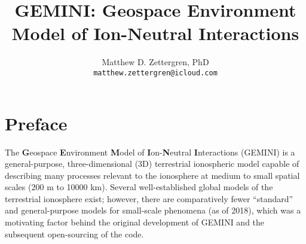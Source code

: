 \documentclass[11pt,letterpaper]{article}
\begin{document}
\setlength{\parindent}{0mm}
\setlength{\parskip}{0.4cm}




\title{\textbf{GEMINI}:  \textbf{G}eospace \textbf{E}nvironment \textbf{M}odel of \textbf{I}on-\textbf{N}eutral \textbf{I}nteractions}
\author{Matthew D. Zettergren, PhD\\ \texttt{matthew.zettergren@icloud.com}}
\maketitle

\tableofcontents

\pagebreak








\section{Preface}

The \textbf{G}eospace \textbf{E}nvironment \textbf{M}odel of \textbf{I}on-\textbf{N}eutral \textbf{I}nteractions (GEMINI) is a general-purpose, three-dimensional (3D) terrestrial ionospheric model capable of describing many processes relevant to the ionosphere at medium to small spatial scales (200 m to 10000 km).  Several well-established global models of the terrestrial ionosphere exist; however, there are comparatively fewer ``standard'' and general-purpose models for small-scale phenomena (as of 2018), which was a motivating factor behind the original development of GEMINI and the subsequent open-sourcing of the code.  

\end{document}
